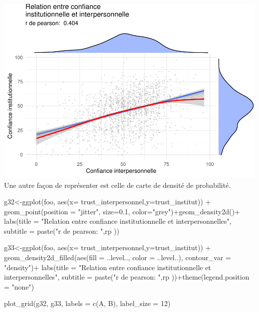 \documentclass[
]{book}
\newenvironment{Shaded}{\begin{snugshade}}{\end{snugshade}}
\newcommand{\AttributeTok}[1]{\textcolor[rgb]{0.77,0.63,0.00}{#1}}
\newcommand{\DecValTok}[1]{\textcolor[rgb]{0.00,0.00,0.81}{#1}}
\newcommand{\FloatTok}[1]{\textcolor[rgb]{0.00,0.00,0.81}{#1}}
\newcommand{\FunctionTok}[1]{\textcolor[rgb]{0.00,0.00,0.00}{#1}}
\newcommand{\NormalTok}[1]{#1}
\newcommand{\OtherTok}[1]{\textcolor[rgb]{0.56,0.35,0.01}{#1}}
\newcommand{\SpecialCharTok}[1]{\textcolor[rgb]{0.00,0.00,0.00}{#1}}
\newcommand{\StringTok}[1]{\textcolor[rgb]{0.31,0.60,0.02}{#1}}
\begin{document}
\includegraphics{bookdown-demo_files/figure-latex/0415-1.pdf}
Une autre façon de représenter est celle de carte de densité de probabilité.

\begin{Shaded}
\begin{Highlighting}[]
\NormalTok{g32}\OtherTok{\textless{}{-}}\FunctionTok{ggplot}\NormalTok{(foo, }\FunctionTok{aes}\NormalTok{(}\AttributeTok{x=}\NormalTok{ trust\_interpersonnel,}\AttributeTok{y=}\NormalTok{trust\_institut)) }\SpecialCharTok{+}
  \FunctionTok{geom\_point}\NormalTok{(}\AttributeTok{position =} \StringTok{"jitter"}\NormalTok{, }\AttributeTok{size=}\FloatTok{0.1}\NormalTok{, }\AttributeTok{color=}\StringTok{"grey"}\NormalTok{)}\SpecialCharTok{+}\FunctionTok{geom\_density2d}\NormalTok{()}\SpecialCharTok{+}
  \FunctionTok{labs}\NormalTok{(}\AttributeTok{title =} \StringTok{"Relation entre confiance institutionnelle et interpersonnelles"}\NormalTok{, }\AttributeTok{subtitle =} \FunctionTok{paste}\NormalTok{(}\StringTok{"r de pearson: "}\NormalTok{,rp ))}
  
\NormalTok{g33}\OtherTok{\textless{}{-}}\FunctionTok{ggplot}\NormalTok{(foo, }\FunctionTok{aes}\NormalTok{(}\AttributeTok{x=}\NormalTok{ trust\_interpersonnel,}\AttributeTok{y=}\NormalTok{trust\_institut)) }\SpecialCharTok{+}
  \FunctionTok{geom\_density2d\_filled}\NormalTok{(}\FunctionTok{aes}\NormalTok{(}\AttributeTok{fill =}\NormalTok{ ..level.., }\AttributeTok{color =}\NormalTok{ ..level..),}
    \AttributeTok{contour\_var =} \StringTok{"density"}\NormalTok{)}\SpecialCharTok{+}
  \FunctionTok{labs}\NormalTok{(}\AttributeTok{title =} \StringTok{"Relation entre confiance institutionnelle et interpersonnelles"}\NormalTok{, }\AttributeTok{subtitle =} \FunctionTok{paste}\NormalTok{(}\StringTok{"r de pearson: "}\NormalTok{,rp ))}\SpecialCharTok{+}\FunctionTok{theme}\NormalTok{(}\AttributeTok{legend.position =} \StringTok{"none"}\NormalTok{)}
  

\FunctionTok{plot\_grid}\NormalTok{(g32, g33, }\AttributeTok{labels =} \FunctionTok{c}\NormalTok{(}\StringTok{\textquotesingle{}A\textquotesingle{}}\NormalTok{, }\StringTok{\textquotesingle{}B\textquotesingle{}}\NormalTok{), }\AttributeTok{label\_size =} \DecValTok{12}\NormalTok{)}
\end{Highlighting}
\end{Shaded}
\end{document}
